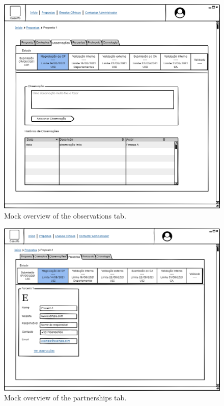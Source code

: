 \begin{figure}[H]
    \centering
    \includegraphics[scale=0.35]{Chapters/img/propostas/proposta-observações.png}
    \caption{Mock overview of the observations tab.}
    \label{fig:proposta-observações}
\end{figure}

\begin{figure}[H]
    \centering
    \includegraphics[scale=0.35]{Chapters/img/propostas/proposta-parcerias.png}
    \caption{Mock overview of the partnerships tab.}
    \label{fig:proposta-parcerias}
\end{figure}

